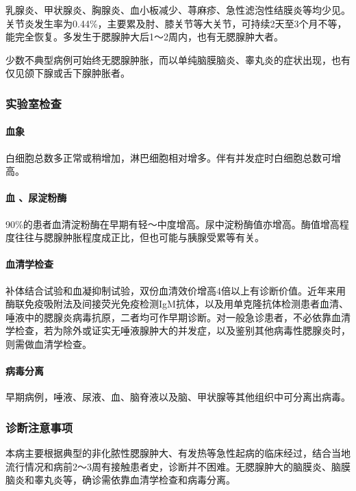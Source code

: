 乳腺炎、甲状腺炎、胸腺炎、血小板减少、荨麻疹、急性滤泡性结膜炎等均少见。关节炎发生率为0.44\%，主要累及肘、膝关节等大关节，可持续2天至3个月不等，能完全恢复。多发生于腮腺肿大后1～2周内，也有无腮腺肿大者。

少数不典型病例可始终无腮腺肿胀，而以单纯脑膜脑炎、睾丸炎的症状出现，也有仅见颌下腺或舌下腺肿胀者。

\subsubsection{实验室检查}

\paragraph{血象}

白细胞总数多正常或稍增加，淋巴细胞相对增多。伴有并发症时白细胞总数可增高。

\paragraph{血 、尿淀粉酶}

90\%的患者血清淀粉酶在早期有轻～中度增高。尿中淀粉酶值亦增高。酶值增高程度往往与腮腺肿胀程度成正比，但也可能与胰腺受累等有关。

\paragraph{血清学检查}

补体结合试验和血凝抑制试验，双份血清效价增高4倍以上有诊断价值。近年来用酶联免疫吸附法及间接荧光免疫检测IgM抗体，以及用单克隆抗体检测患者血清、唾液中的腮腺炎病毒抗原，二者均可作早期诊断。对一般急诊患者，不必依靠血清学检查，若为除外或证实无唾液腺肿大的并发症，以及鉴别其他病毒性腮腺炎时，则需做血清学检查。

\paragraph{病毒分离}

早期病例，唾液、尿液、血、脑脊液以及脑、甲状腺等其他组织中可分离出病毒。

\subsubsection{诊断注意事项}

本病主要根据典型的非化脓性腮腺肿大、有发热等急性起病的临床经过，结合当地流行情况和病前2～3周有接触患者史，诊断并不困难。无腮腺肿大的脑膜炎、脑膜脑炎和睾丸炎等，确诊需依靠血清学检查和病毒分离。

